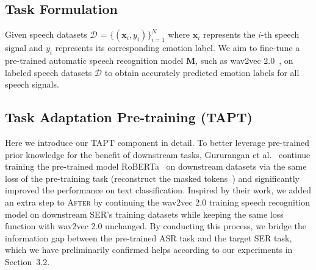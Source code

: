 \documentclass{article}
\begin{document}
\subsection{Task Formulation}
Given speech datasets $\mathcal{D}$ = $\{(\mathbf{x}_{i},y_{i})\}_{i=1}^{N}$ where $\mathbf{x}_{i}$ represents the $i$-th speech signal and $y_{i}$ represents its corresponding emotion label. 
We aim to fine-tune a pre-trained automatic speech recognition model $\mathbf{M}$, such as wav2vec 2.0~\cite{2110-06309}, on labeled speech datasets $\mathcal{D}$ to obtain accurately predicted emotion labels for all speech signals. 




\subsection{Task Adaptation Pre-training (TAPT)}
Here we introduce our TAPT component in detail. 
To better leverage pre-trained prior knowledge for the benefit of downstream tasks, Gururangan et al.~\cite{gururangan-etal-2020-dont} continue training the pre-trained model RoBERTa~\cite{Roberta} on downstream datasets via the same loss of the pre-training task (reconstruct the masked tokens~\cite{kenton2019bert}) and significantly improved the performance on text classification.
%
Inspired by their work, we added an extra step to \textsc{After} by continuing the wav2vec 2.0 training speech recognition model on downstream SER's training datasets while keeping the same loss function with wav2vec 2.0 unchanged. By conducting this process, we bridge the information gap between the pre-trained ASR task and the target SER task, which we have preliminarily confirmed helps according to our experiments in Section~3.2.
\end{document}
